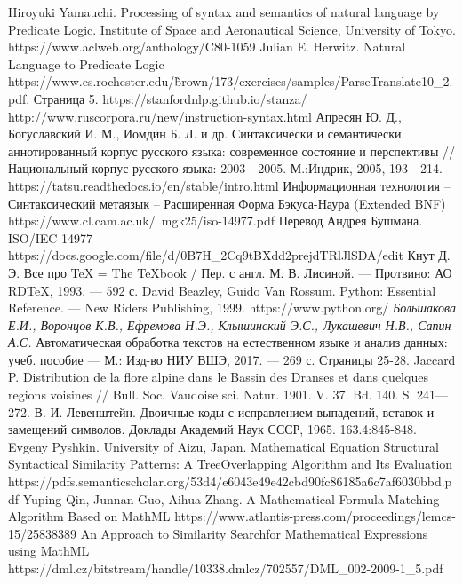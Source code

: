 \documentclass[12pt]{article}
\begin{document}
\newpage
{}
\begin{thebibliography}{}
Hiroyuki Yamauchi. Processing of syntax and semantics of natural language by Predicate Logic. Institute of Space and Aeronautical Science, University of Tokyo. 
https://www.aclweb.org/anthology/C80-1059 
Julian E. Herwitz. Natural Language to Predicate Logic https://www.cs.rochester.edu/\~brown/173/exercises/samples/ParseTranslate10\_2.pdf. Страница 5.
https://stanfordnlp.github.io/stanza/
http://www.ruscorpora.ru/new/instruction-syntax.html
Апресян Ю. Д., Богуславский И. М., Иомдин Б. Л. и др. Синтаксически и семантически аннотированный корпус русского языка: современное состояние и перспективы // Национальный корпус русского языка: 2003—2005. М.:Индрик, 2005, 193—214.
https://tatsu.readthedocs.io/en/stable/intro.html
Информационная технология – Синтаксический метаязык – Расширенная Форма Бэкуса-Наура (Extended BNF)
https://www.cl.cam.ac.uk/~mgk25/iso-14977.pdf  
Перевод Андрея Бушмана. ISO/IEC 14977 https://docs.google.com/file/d/0B7H\_2Cq9tBXdd2prejdTRlJlSDA/edit
Кнут Д. Э. Все про TeX = The TeXbook / Пер. с англ. М. В. Лисиной. — Протвино: АО RDTeX, 1993. — 592 с. 
David Beazley, Guido Van Rossum. Python: Essential Reference. — New Riders Publishing, 1999.
https://www.python.org/
 \textit{Большакова Е.И., Воронцов К.В., Ефремова Н.Э.,
Клышинский Э.С., Лукашевич Н.В., Сапин А.С.} Автоматическая обработка текстов на естественном языке и анализ
данных: учеб. пособие — М.: Изд-во НИУ ВШЭ,
2017. — 269 с. Страницы 25-28.
Jaccard P. Distribution de la flore alpine dans le Bassin des Dranses et dans quelques regions voisines // Bull. Soc. Vaudoise sci. Natur. 1901. V. 37. Bd. 140. S. 241—272.
В. И. Левенштейн. Двоичные коды с исправлением выпадений, вставок и замещений символов. Доклады Академий Наук СССР, 1965. 163.4:845-848.
Evgeny Pyshkin. University of Aizu, Japan. Mathematical Equation Structural Syntactical Similarity Patterns: A TreeOverlapping Algorithm and Its Evaluation
https://pdfs.semanticscholar.org/53d4/e6043e49e42cbd90fc86185a6c7af6030bbd.pdf
Yuping Qin, Junnan Guo, Aihua Zhang. A Mathematical Formula Matching Algorithm Based on MathML
https://www.atlantis-press.com/proceedings/lemcs-15/25838389
An Approach to Similarity Searchfor Mathematical Expressions using MathML
https://dml.cz/bitstream/handle/10338.dmlcz/702557/DML\_002-2009-1\_5.pdf
\end{thebibliography}
\end{document}
